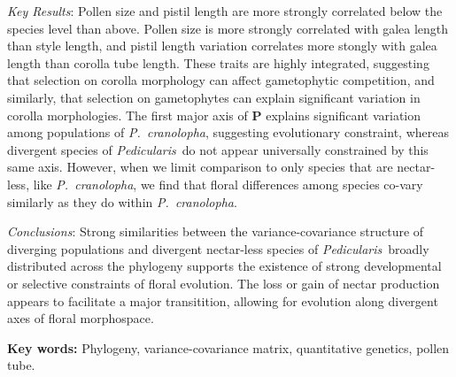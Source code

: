 \documentclass[12pt,letterpaper]{article}
\def\PC{\emph{P.~cranolopha}}
\def\P{\emph{Pedicularis}}
\begin{document}
\begin{itemize}
{\item \emph{Key Results}: Pollen size and pistil length are more strongly correlated below the species level than above. Pollen size is more strongly correlated with galea length than style length, and pistil length variation correlates more stongly with galea length than corolla tube length. These traits are highly integrated, suggesting that selection on corolla morphology can affect gametophytic competition, and similarly, that selection on gametophytes can explain significant variation in corolla morphologies. 
The first major axis of {\bf P} explains significant variation among populations of \PC, suggesting evolutionary constraint, whereas divergent species of \P~do not appear universally constrained by this same axis. However, when we limit comparison to only species that are nectar-less, like \PC, we find that floral differences among species co-vary similarly as they do within \PC. 

\item \emph{Conclusions}: Strong similarities between the variance-covariance structure of diverging populations and divergent nectar-less species of \P~broadly distributed across the phylogeny supports the existence of strong developmental or selective constraints of floral evolution. The loss or gain of nectar production appears to facilitate a major transitition, allowing for evolution along divergent axes of floral morphospace. 
}
\end{itemize}

{\bf Key words:} Phylogeny, variance-covariance matrix, quantitative genetics, pollen tube.

\bigskip
\bigskip


\noindent 
\end{document}
